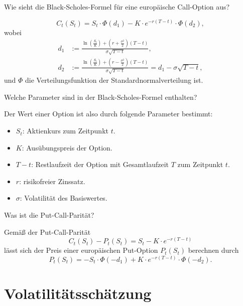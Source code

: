 \begin{QandA}
    \item Wie sieht die Black-Scholes-Formel für eine europäische Call-Option aus?
    \begin{answered}
        \[
            C_t(S_t) = S_t \cdot \Phi(d_1) - K \cdot e^{-r(T-t)} \cdot \Phi(d_2),
        \]
        wobei
        \[
            \begin{aligned}
                d_1 & := \frac{\ln(\frac{S_t}{K}) + (r + \frac{\sigma^2}{2})(T-t)}{\sigma \sqrt{T-t}},                            \\
                d_2 & := \frac{\ln(\frac{S_t}{K}) + (r - \frac{\sigma^2}{2})(T-t)}{\sigma \sqrt{T-t}} = d_1 - \sigma \sqrt{T-t} ,
            \end{aligned}
        \]
        und $\Phi$ die Verteilungsfunktion der Standardnormalverteilung ist.
    \end{answered}

    \item Welche Parameter sind in der Black-Scholes-Formel enthalten?
    \begin{answered}
        Der Wert einer Option ist also durch folgende Parameter bestimmt:
        \begin{itemize}
            \item $S_t$: Aktienkurs zum Zeitpunkt $t$.
            \item $K$: Ausübungspreis der Option.
            \item $T-t$: Restlaufzeit der Option mit Gesamtlaufzeit $T$ zum Zeitpunkt $t$.
            \item $r$: risikofreier Zinssatz.
            \item $\sigma$: Volatilität des Basiswertes.
        \end{itemize}
    \end{answered}

    \item Was ist die Put-Call-Parität?
    \begin{answered}
        Gemäß der Put-Call-Parität
        \[
            C_t(S_t) - P_t(S_t) = S_t - K \cdot e^{-r(T-t)}
        \]
        lässt sich der Preis einer europäischen Put-Option $P_t(S_t)$ berechnen durch
        \[
            P_t(S_t) = - S_t \cdot \Phi(-d_1) + K \cdot e^{-r(T-t)} \cdot \Phi(-d_2).
        \]
    \end{answered}
\end{QandA}

\newpage
\section*{Volatilitätsschätzung}

